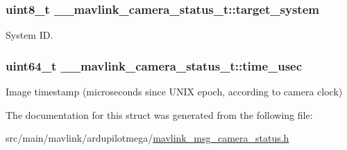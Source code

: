 \hypertarget{struct____mavlink__camera__status__t_a3886bbba5cff1758e5da10c463aeb391}{
\subsubsection[{target\+\_\+system}]{\setlength{\rightskip}{0pt plus 5cm}uint8\+\_\+t \+\_\+\+\_\+mavlink\+\_\+camera\+\_\+status\+\_\+t\+::target\+\_\+system}}\label{struct____mavlink__camera__status__t_a3886bbba5cff1758e5da10c463aeb391}


System I\+D. 

\hypertarget{struct____mavlink__camera__status__t_a12593dc20e6c4488d604b0cc3a6173d7}{
\subsubsection[{time\+\_\+usec}]{\setlength{\rightskip}{0pt plus 5cm}uint64\+\_\+t \+\_\+\+\_\+mavlink\+\_\+camera\+\_\+status\+\_\+t\+::time\+\_\+usec}}\label{struct____mavlink__camera__status__t_a12593dc20e6c4488d604b0cc3a6173d7}


Image timestamp (microseconds since U\+N\+I\+X epoch, according to camera clock) 



The documentation for this struct was generated from the following file\+:\begin{DoxyCompactItemize}
\item 
src/main/mavlink/ardupilotmega/\hyperlink{mavlink__msg__camera__status_8h}{mavlink\+\_\+msg\+\_\+camera\+\_\+status.\+h}\end{DoxyCompactItemize}
